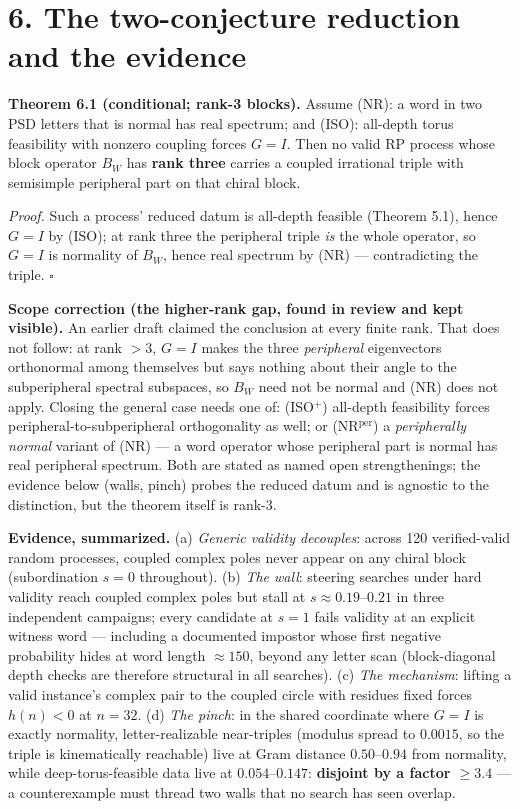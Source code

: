 \documentclass[11pt]{article}
\begin{document}
\section*{6. The two-conjecture reduction and the evidence}
\textbf{Theorem 6.1 (conditional; rank-3 blocks).}  Assume (NR): a word in two PSD letters that is normal has real spectrum; and (ISO): all-depth torus feasibility with nonzero coupling forces $G = I$.  Then no valid RP process whose block operator $B_W$ has \textbf{rank three} carries a coupled irrational triple with semisimple peripheral part on that chiral block.

\emph{Proof.}  Such a process' reduced datum is all-depth feasible (Theorem 5.1), hence $G = I$ by (ISO); at rank three the peripheral triple \emph{is} the whole operator, so $G = I$ is normality of $B_W$, hence real spectrum by (NR) — contradicting the triple.  $\square$

\textbf{Scope correction (the higher-rank gap, found in review and kept visible).}  An earlier draft claimed the conclusion at every finite rank.  That does not follow: at rank $> 3$, $G = I$ makes the three \emph{peripheral} eigenvectors orthonormal among themselves but says nothing about their angle to the subperipheral spectral subspaces, so $B_W$ need not be normal and (NR) does not apply. Closing the general case needs one of: (ISO$^+$) all-depth feasibility forces peripheral-to-subperipheral orthogonality as well; or (NR$^{\mathrm{per}}$) a \emph{peripherally normal} variant of (NR) — a word operator whose peripheral part is normal has real peripheral spectrum.  Both are stated as named open strengthenings; the evidence below (walls, pinch) probes the reduced datum and is agnostic to the distinction, but the theorem itself is rank-3.

\textbf{Evidence, summarized.}  (a) \emph{Generic validity decouples}: across 120 verified-valid random processes, coupled complex poles never appear on any chiral block (subordination $s = 0$ throughout). (b) \emph{The wall}: steering searches under hard validity reach coupled complex poles but stall at $s \approx 0.19$–$0.21$ in three independent campaigns; every candidate at $s = 1$ fails validity at an explicit witness word — including a documented impostor whose first negative probability hides at word length $\approx 150$, beyond any letter scan (block-diagonal depth checks are therefore structural in all searches).  (c) \emph{The mechanism}: lifting a valid instance's complex pair to the coupled circle with residues fixed forces $h(n) < 0$ at $n = 32$.  (d) \emph{The pinch}: in the shared coordinate where $G = I$ is exactly normality, letter-realizable near-triples (modulus spread to $0.0015$, so the triple is kinematically reachable) live at Gram distance $0.50$–$0.94$ from normality, while deep-torus-feasible data live at $0.054$–$0.147$: \textbf{disjoint by a factor $\ge 3.4$} — a counterexample must thread two walls that no search has seen overlap.
\end{document}

